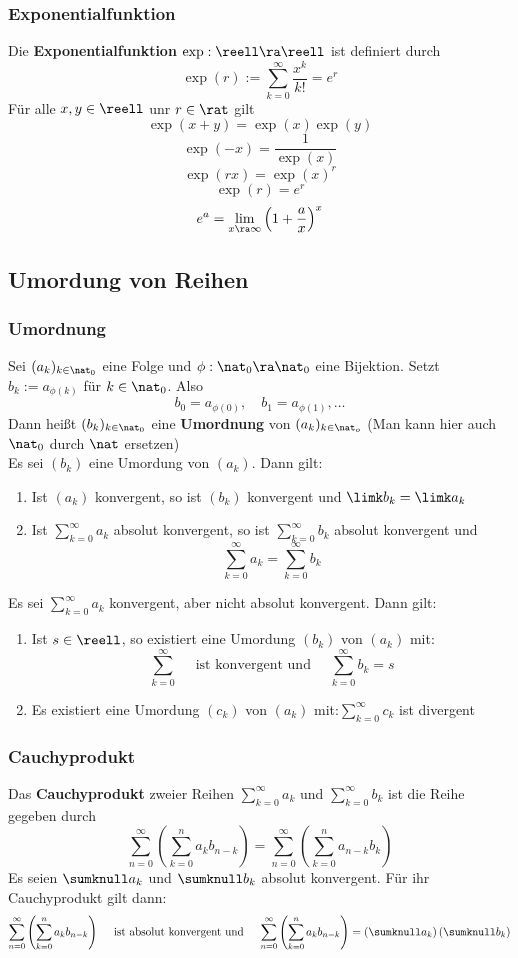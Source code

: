 \documentclass{kit}
\begin{document}
    \subsubsection{Exponentialfunktion}
      Die \textbf{Exponentialfunktion} $\exp:\reell\ra\reell$ ist definiert durch
      $$\exp(r):=\sum^\infty_{k=0}\frac{x^k}{k!}=e^r$$
      Für alle $x,y\in\reell$ unr $r\in\rat$ gilt
      $$\exp(x+y)=\exp(x)\exp(y)$$
      $$\exp(-x)=\frac{1}{\exp(x)}$$
      $$\exp(rx)=\exp(x)^r$$
      $$\exp(r)=e^r$$
      $$e^a=\lim_{x\ra\infty}\left(1+\frac{a}{x}\right)^x$$
  \subsection{Umordung von Reihen}
    \subsubsection{Umordnung}
      Sei $(a_k)_{k\in\nat_0}$ eine Folge und $\phi:\nat_0\ra\nat_0$ eine Bijektion. Setzt $b_k:=a_{\phi(k)}$ für $k\in\nat_0$. Also
      $$b_0=a_{\phi(0)},\quad b_1=a_{\phi(1)},\dots$$
      Dann heißt $(b_k)_{k\in\nat_0}$ eine \textbf{Umordnung} von $(a_k)_{k\in\nat_o}$ (Man kann hier auch $\nat_0$ durch $\nat$ ersetzen)\\
      Es sei $(b_k)$ eine Umordung von $(a_k)$. Dann gilt:
      \begin{enumerate}
        \item Ist $(a_k)$ konvergent, so ist $(b_k)$ konvergent und $\limk b_k=\limk a_k$
        \item Ist $\sum^\infty_{k=0}a_k$ absolut konvergent, so ist $\sum^\infty_{k=0}b_k$ absolut konvergent und
          $$\sum^\infty_{k=0}a_k=\sum^\infty_{k=0}b_k$$
      \end{enumerate}
      Es sei $\sum^\infty_{k=0}a_k$ konvergent, aber nicht absolut konvergent. Dann gilt:
      \begin{enumerate}
        \item Ist $s\in\reell$, so existiert eine Umordung $(b_k)$ von $(a_k)$ mit:
          $$\sum^\infty_{k=0}\quad\text{ ist konvergent und }\quad\sum^\infty_{k=0}b_k=s$$
        \item Es existiert eine Umordung $(c_k)$ von $(a_k)$ mit:$\sum^\infty_{k=0}c_k$ ist divergent
      \end{enumerate}
    \subsubsection{Cauchyprodukt}
      Das \textbf{Cauchyprodukt} zweier Reihen $\sum^\infty_{k=0}a_k$ und $\sum^\infty_{k=0}b_k$ ist die Reihe gegeben durch
      $$\sum^\infty_{n=0}\left(\sum^n_{k=0}a_kb_{n-k}\right)=\sum^\infty_{n=0}\left(\sum^n_{k=0}a_{n-k}b_k\right)$$
      Es seien $\sumknull a_k$ und $\sumknull b_k$ absolut konvergent. Für ihr Cauchyprodukt gilt dann:
      $$\sum^\infty_{n=0}\left(\sum^n_{k=0}a_kb_{n-k}\right)\quad\text{ ist absolut konvergent und }\quad \sum^\infty_{n=0}\left(\sum^n_{k=0}a_kb_{n-k}\right)=\left(\sumknull a_k\right)\left(\sumknull b_k\right)$$
\end{document}
